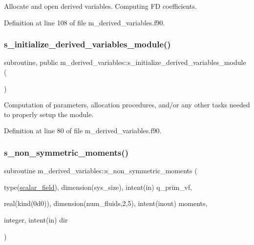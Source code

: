 Allocate and open derived variables. Computing FD coefficients. 



Definition at line 108 of file m\+\_\+derived\+\_\+variables.\+f90.

\mbox{\label{namespacem__derived__variables_a15a6d70e2bd1c9b7001c753ca1f2ee27}} 
\subsubsection{\texorpdfstring{s\+\_\+initialize\+\_\+derived\+\_\+variables\+\_\+module()}{s\_initialize\_derived\_variables\_module()}}
{\footnotesize\ttfamily subroutine, public m\+\_\+derived\+\_\+variables\+::s\+\_\+initialize\+\_\+derived\+\_\+variables\+\_\+module (\begin{DoxyParamCaption}{ }\end{DoxyParamCaption})}



Computation of parameters, allocation procedures, and/or any other tasks needed to properly setup the module. 



Definition at line 80 of file m\+\_\+derived\+\_\+variables.\+f90.

\mbox{\label{namespacem__derived__variables_a2ee18c156bb444c6ab73d4762960ef67}} 
\subsubsection{\texorpdfstring{s\+\_\+non\+\_\+symmetric\+\_\+moments()}{s\_non\_symmetric\_moments()}}
{\footnotesize\ttfamily subroutine m\+\_\+derived\+\_\+variables\+::s\+\_\+non\+\_\+symmetric\+\_\+moments (\begin{DoxyParamCaption}\item[{type(\hyperlink{structm__derived__types_1_1scalar__field}{scalar\+\_\+field}), dimension(sys\+\_\+size), intent(in)}]{q\+\_\+prim\+\_\+vf,  }\item[{real(kind(0d0)), dimension(num\+\_\+fluids,2,5), intent(inout)}]{moments,  }\item[{integer, intent(in)}]{dir }\end{DoxyParamCaption})}



